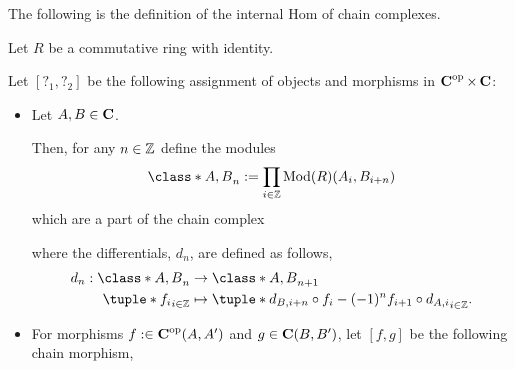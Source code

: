 The following is the definition of the internal Hom of chain complexes. 
\begin{definition}
    \label{def:internal_hom_of_chain_complexes_over_Mod(R)}
    Let \( R \) be a commutative ring with identity.
    
    Let \( [?_1, ?_2] \) be the following assignment of objects and morphisms in \( \operatorname{\mathbf{C}}^{\operatorname{op}} \times \operatorname{\mathbf{C}} \):

    \begin{itemize}
        \item {
            Let \( A, B \in \operatorname{\mathbf{C}} \).

            Then, for any \( n \in {\mathbb{Z}} \) define the modules
            \[
                \class*{A, B}_n := \prod_{i \in \Zb} \Mod(R)(A_i, B_{i + n})
            \]
            which are a part of the chain complex
            \begin{center}
            \end{center}
            where the differentials, \( d_n \), are defined as follows,
            \begin{align*}
                d_n : \class*{A, B}_n &\to \class*{A, B}_{n + 1} \\
                \tuple*{f_i}_{i \in \Zb} &\mapsto \tuple*{d_{B, i + n} \circ f_i - (-1)^n f_{i + 1} \circ d_{A, i}}_{i \in \Zb}.
            \end{align*}
        }
        \item {
            For morphisms \( f: \in \operatorname{\mathbf{C}}^{\operatorname{op}}(A, A') \) and \( g \in \operatorname{\mathbf{C}}(B, B') \), let \( [f, g] \) be the following chain morphism,
            \begin{center}
\end{center}}
\end{itemize}
\end{definition}
